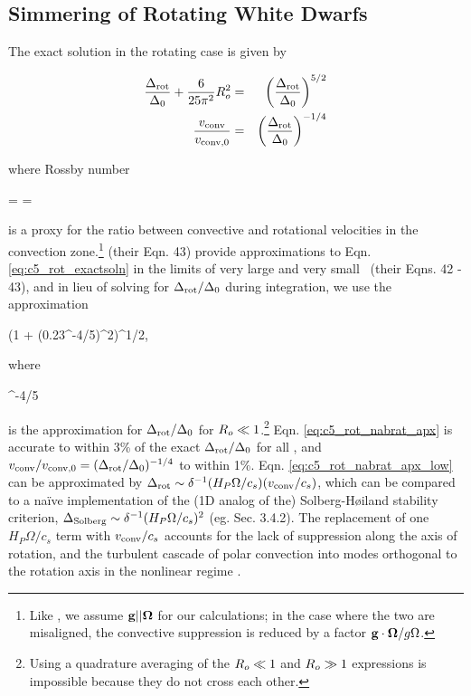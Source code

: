 \subsection{Simmering of Rotating White Dwarfs}
\label{ssec:c5_runaway_rot}

The exact solution in the rotating case is given by \citeal{stev79} 

\begin{eqnarray}
\frac{\dnabrot}{\dnabconvzero} + \frac{6}{25\pi^2}\rossby^2 &=& \left(\frac{\dnabrot}{\dnabconvzero}\right)^{5/2} \nonumber \\
\frac{\vconv}{\vconvzero} &=& \left(\frac{\dnabrot}{\dnabconvzero}\right)^{-1/4}
\label{eq:c5_rot_exactsoln}
\end{eqnarray}

\noindent where Rossby number

\eqbegin
\rossby =  = 
\label{eq:c5_rossbynumber}
\eqend

\noindent is a proxy for the ratio between convective and rotational velocities in the convection zone.\footnote{Like \cite{barkdl14}, we assume ${\bf g}||\boldsymbol{\Omega}$ for our calculations; in the case where the two are misaligned, the convective suppression is reduced by a factor ${\bf g}\cdot \boldsymbol{\Omega}/g\Omega$.}  \citeal{stev79} (their Eqn. 43) provide approximations to Eqn. \ref{eq:c5_rot_exactsoln} in the limits of very large and very small \rossby\ (their Eqns. 42 - 43), and in lieu of solving for $\dnabrot/\dnabconvzero$ during integration, we use the approximation

\eqbegin
\frac{\dnabrot}{\dnabconvzero} \approx \left(1 + \left(0.23\rossby^{-4/5}\right)^2\right)^{1/2},
\label{eq:c5_rot_nabrat_apx}
\eqend

\noindent where

\eqbegin
\frac{\dnabrot}{\dnabconvzero}  \rossby^{-4/5}
\label{eq:c5_rot_nabrat_apx_low}
\eqend

\noindent is the \citeal{stev79} approximation for $\dnabrot/\dnabconvzero$ for $\rossby \ll 1$.\footnote{Using a quadrature averaging of the \citeal{stev79} $\rossby \ll 1$ and $\rossby \gg 1$ expressions is impossible because they do not cross each other.}   Eqn. \ref{eq:c5_rot_nabrat_apx} is accurate to within 3\% of the exact $\dnabrot/\dnabconvzero$ for all \rossby, and $\vconv/\vconvzero = (\dnabrot/\dnabconvzero)^{-1/4}$ to within 1\%.  Eqn. \ref{eq:c5_rot_nabrat_apx_low} can be approximated by $\dnabrot \sim \delta^{-1}(H_P\Omega/c_s)(\vconv/c_s)$, which can be compared to a na\"{i}ve implementation of the (1D analog of the) Solberg-H{\o}iland stability criterion, $\Delta_\mathrm{Solberg} \sim \delta^{-1}(H_P\Omega/c_s)^2$ (eg. \citealt{tass00} Sec. 3.4.2).  The replacement of one $H_P\Omega/c_s$ term with $\vconv/c_s$ accounts for the lack of suppression along the axis of rotation, and the turbulent cascade of polar convection into modes orthogonal to the rotation axis in the nonlinear regime \citep{barkdl14}.

